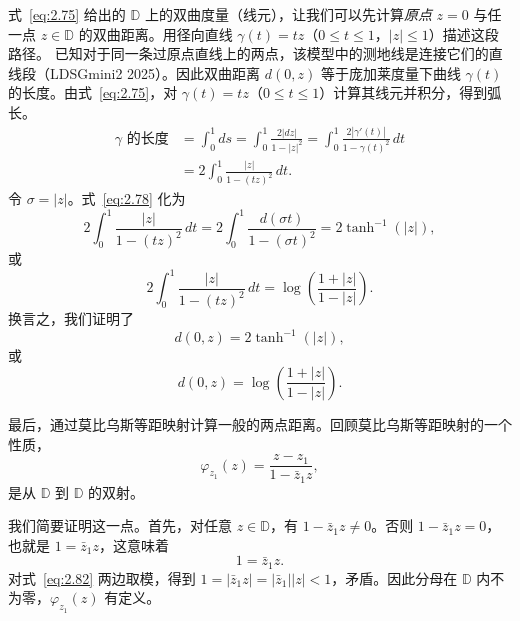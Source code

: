 式~\eqref{eq:2.75} 给出的 $\mathbb D$ 上的双曲度量（线元），让我们可以先计算\emph{原点} $z=0$ 与任一点 $z\in\mathbb D$ 的双曲距离。用径向直线 $\gamma(t)=tz$（$0\leq t\leq 1$，$|z|\leq 1$）描述这段路径。 已知对于同一条过原点直线上的两点，该模型中的测地线是连接它们的直线段（LDSGmini2 2025）。因此双曲距离 $d(0,z)$ 等于庞加莱度量下曲线 $\gamma(t)$ 的长度。由式~\eqref{eq:2.75}，对 $\gamma(t)=tz$（$0\leq t\leq1$）计算其线元并积分，得到弧长。
\begin{equation*}
  \begin{aligned}
    \gamma\text{ 的长度}
      &=\int_0^1 ds=\int_0^1\frac{2|dz|}{1-|z|^2}
        =\int_0^1\frac{2|\gamma'(t)|}{1-\gamma(t)^2}\,dt\\
      &=2\int_0^1\frac{|z|}{1-(tz)^2}\,dt.
  \end{aligned}
  \tag{2.78}\label{eq:2.78}
\end{equation*}
令 $\sigma=|z|$。式~\eqref{eq:2.78} 化为
\[
  2\int_0^1\frac{|z|}{1-(tz)^2}\,dt
    =2\int_0^1\frac{d(\sigma t)}{1-(\sigma t)^2}
    =2\tanh^{-1}(|z|),
\]
或
\[
  2\int_0^1\frac{|z|}{1-(tz)^2}\,dt
    =\log\!\left(\frac{1+|z|}{1-|z|}\right).
\]
换言之，我们证明了
\begin{equation*}
  d(0,z)=2\tanh^{-1}(|z|),
  \tag{2.79}\label{eq:2.79}
\end{equation*}
或
\begin{equation*}
  d(0,z)=\log\!\left(\frac{1+|z|}{1-|z|}\right).
  \tag{2.80}\label{eq:2.80}
\end{equation*}

最后，通过莫比乌斯等距映射计算一般的两点距离。回顾莫比乌斯等距映射的一个性质，
\begin{equation*}
  \varphi_{z_1}(z)=\frac{z-z_1}{1-\bar z_1z},
  \tag{2.81}\label{eq:2.81}
\end{equation*}
是从 $\mathbb D$ 到 $\mathbb D$ 的双射。

我们简要证明这一点。首先，对任意 $z\in\mathbb D$，有 $1-\bar z_1z\neq0$。否则 $1-\bar z_1z=0$，也就是 $1=\bar z_1z$，这意味着
\begin{equation*}
  1=\bar z_1z.
  \tag{2.82}\label{eq:2.82}
\end{equation*}
对式~\eqref{eq:2.82} 两边取模，得到 $1=|\bar z_1z|=|\bar z_1||z|<1$，矛盾。因此分母在 $\mathbb D$ 内不为零，$\varphi_{z_1}(z)$ 有定义。

